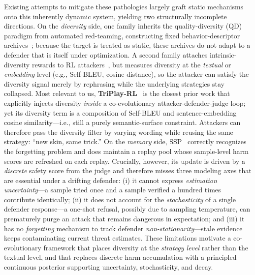 Existing attempts to mitigate these pathologies largely graft static mechanisms onto this inherently dynamic system, yielding two structurally incomplete directions. On the \emph{diversity} side, one family inherits the quality-diversity (QD) paradigm from automated red-teaming, constructing fixed behavior-descriptor archives~\citep{samvelyan2024rainbow, han2024ruby, pala2025ferret, dang2025rainbowplus, wang2025qdrt}; because the target is treated as static, these archives do not adapt to a defender that is itself under optimization. A second family attaches intrinsic-diversity rewards to RL attackers~\citep{hong2024curiosity, zhao2025diverct, lee2025gflownet, wang2025jailbreakr1, beutel2024openaidiverse}, but measures diversity at the \emph{textual} or \emph{embedding} level (e.g., Self-BLEU, cosine distance), so the attacker can satisfy the diversity signal merely by rephrasing while the underlying strategies stay collapsed. Most relevant to us, \textbf{TriPlay-RL}~\citep{triplayrl2026} is the closest prior work that explicitly injects diversity \emph{inside} a co-evolutionary attacker-defender-judge loop; yet its diversity term is a composition of Self-BLEU and sentence-embedding cosine similarity---i.e., still a purely semantic-surface constraint. Attackers can therefore pass the diversity filter by varying wording while reusing the same strategy: ``new skin, same trick.'' On the \emph{memory} side, SSP~\citep{ssp2026} correctly recognizes the forgetting problem and does maintain a replay pool whose sample-level harm scores are refreshed on each replay. Crucially, however, its update is driven by a \emph{discrete} safety score from the judge and therefore misses three modeling axes that are essential under a drifting defender: (i) it cannot express \emph{estimation uncertainty}---a sample tried once and a sample verified a hundred times contribute identically; (ii) it does not account for the \emph{stochasticity} of a single defender response---a one-shot refusal, possibly due to sampling temperature, can prematurely purge an attack that remains dangerous in expectation; and (iii) it has no \emph{forgetting} mechanism to track defender \emph{non-stationarity}---stale evidence keeps contaminating current threat estimates. These limitations motivate a co-evolutionary framework that places diversity at the \emph{strategy level} rather than the textual level, and that replaces discrete harm accumulation with a principled continuous posterior supporting uncertainty, stochasticity, and decay.

